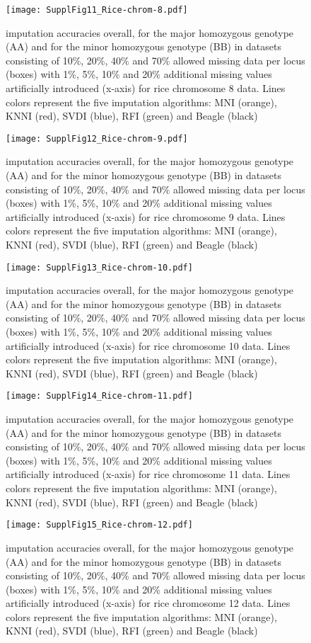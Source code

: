 \begin{figure}\texttt{[image: SupplFig11\_Rice-chrom-8.pdf]}\caption{
imputation accuracies overall, for the major homozygous genotype (AA) and for the minor homozygous genotype (BB) in datasets consisting of
10\%, 20\%, 40\% and 70\% allowed missing data per locus (boxes) with 1\%, 5\%, 10\% and 20\%
additional missing values artificially introduced (x-axis) for rice chromosome 8 data.
Lines colors represent the five imputation algorithms: MNI
(orange), KNNI (red), SVDI (blue), RFI (green) and Beagle (black)}\end{figure}
\begin{figure}\texttt{[image: SupplFig12\_Rice-chrom-9.pdf]}\caption{
imputation accuracies overall, for the major homozygous genotype (AA) and for the minor homozygous genotype (BB) in datasets consisting of
10\%, 20\%, 40\% and 70\% allowed missing data per locus (boxes) with 1\%, 5\%, 10\% and 20\%
additional missing values artificially introduced (x-axis) for rice chromosome 9 data.
Lines colors represent the five imputation algorithms: MNI
(orange), KNNI (red), SVDI (blue), RFI (green) and Beagle (black)}\end{figure}
\begin{figure}\texttt{[image: SupplFig13\_Rice-chrom-10.pdf]}\caption{
imputation accuracies overall, for the major homozygous genotype (AA) and for the minor homozygous genotype (BB) in datasets consisting of
10\%, 20\%, 40\% and 70\% allowed missing data per locus (boxes) with 1\%, 5\%, 10\% and 20\%
additional missing values artificially introduced (x-axis) for rice chromosome 10 data.
Lines colors represent the five imputation algorithms: MNI
(orange), KNNI (red), SVDI (blue), RFI (green) and Beagle (black)}\end{figure}
\begin{figure}\texttt{[image: SupplFig14\_Rice-chrom-11.pdf]}\caption{
imputation accuracies overall, for the major homozygous genotype (AA) and for the minor homozygous genotype (BB) in datasets consisting of
10\%, 20\%, 40\% and 70\% allowed missing data per locus (boxes) with 1\%, 5\%, 10\% and 20\%
additional missing values artificially introduced (x-axis) for rice chromosome 11 data.
Lines colors represent the five imputation algorithms: MNI
(orange), KNNI (red), SVDI (blue), RFI (green) and Beagle (black)}\end{figure}
\begin{figure}\texttt{[image: SupplFig15\_Rice-chrom-12.pdf]}\caption{
imputation accuracies overall, for the major homozygous genotype (AA) and for the minor homozygous genotype (BB) in datasets consisting of
10\%, 20\%, 40\% and 70\% allowed missing data per locus (boxes) with 1\%, 5\%, 10\% and 20\%
additional missing values artificially introduced (x-axis) for rice chromosome 12 data.
Lines colors represent the five imputation algorithms: MNI
(orange), KNNI (red), SVDI (blue), RFI (green) and Beagle (black)}\end{figure}
